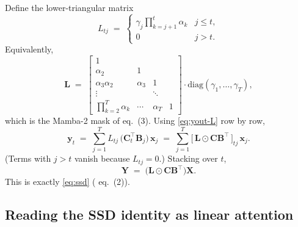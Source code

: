 \documentclass[11pt,a4paper]{article}
\begin{document}
Define the lower-triangular matrix
\begin{equation}\label{eq:L2}
  L_{tj} \;=\;
  \begin{cases}
     \gamma_j\displaystyle\prod_{k=j+1}^{t}\alpha_k & j \le t,\\[4pt]
     0 & j > t.
  \end{cases}
\end{equation}
Equivalently,
\begin{equation}\label{eq:Lmat}
  \bm{L} \;=\;
  \begin{bmatrix}
     1    &      &       &      \\
     \alpha_2 & 1 &       &      \\
     \alpha_3\alpha_2 & \alpha_3 & 1 &   \\
     \vdots & & \ddots & \\
     \prod_{k=2}^{T}\alpha_k & \cdots & \alpha_T & 1
  \end{bmatrix}\cdot\mathrm{diag}(\gamma_1,\dots,\gamma_T),
\end{equation}
which is the Mamba-2 mask of \cite{mamba3} eq.~(3). Using
\eqref{eq:yout-L} row by row,
\begin{equation}\label{eq:rowform}
  \bm{y}_t \;=\; \sum_{j=1}^{T} L_{tj}\,\bigl(\bm{C}_t^\top \bm{B}_j\bigr)\,\bm{x}_j
         \;=\; \sum_{j=1}^{T}
                \bigl[\,\bm{L}\odot\bm{C}\bm{B}^\top\,\bigr]_{tj}\,\bm{x}_j.
\end{equation}
(Terms with $j>t$ vanish because $L_{tj}=0$.) Stacking over $t$,
\begin{equation}\label{eq:ssd-derived}
  \boxed{\;\bm{Y} \;=\; \bigl(\bm{L}\odot \bm{C}\bm{B}^\top\bigr)\bm{X}.\;}
\end{equation}
This is exactly \eqref{eq:ssd} (\cite{mamba3} eq.~(2)).

\subsection{Reading the SSD identity as linear attention}
\end{document}
